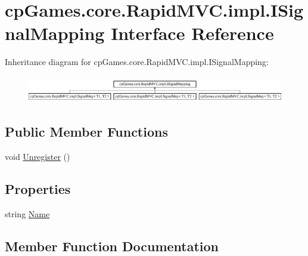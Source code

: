 \hypertarget{interfacecp_games_1_1core_1_1_rapid_m_v_c_1_1impl_1_1_i_signal_mapping}{}\section{cp\+Games.\+core.\+Rapid\+M\+V\+C.\+impl.\+I\+Signal\+Mapping Interface Reference}
\label{interfacecp_games_1_1core_1_1_rapid_m_v_c_1_1impl_1_1_i_signal_mapping}
Inheritance diagram for cp\+Games.\+core.\+Rapid\+M\+V\+C.\+impl.\+I\+Signal\+Mapping\+:\begin{figure}[H]
\begin{center}
\leavevmode
\includegraphics[height=1.174004cm]{interfacecp_games_1_1core_1_1_rapid_m_v_c_1_1impl_1_1_i_signal_mapping}
\end{center}
\end{figure}
\subsection*{Public Member Functions}
\begin{DoxyCompactItemize}
\item 
void \mbox{\hyperlink{interfacecp_games_1_1core_1_1_rapid_m_v_c_1_1impl_1_1_i_signal_mapping_aa20788e1fe80d6671638673782e896bf}{Unregister}} ()
\end{DoxyCompactItemize}
\subsection*{Properties}
\begin{DoxyCompactItemize}
\item 
string \mbox{\hyperlink{interfacecp_games_1_1core_1_1_rapid_m_v_c_1_1impl_1_1_i_signal_mapping_adac75cc2cc5dbba4ed7af9c52f1f7a68}{Name}}
\end{DoxyCompactItemize}


\subsection{Member Function Documentation}
\mbox{\label{interfacecp_games_1_1core_1_1_rapid_m_v_c_1_1impl_1_1_i_signal_mapping_aa20788e1fe80d6671638673782e896bf}} 
